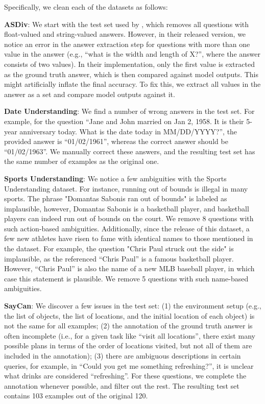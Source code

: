 \documentclass[11pt]{article}
\begin{document}
Specifically, we clean each of the datasets as follows: 

\textbf{ASDiv}: We start with the test set used by \citet{wei_chain_2022}, which removes all questions with float-valued and string-valued answers. However, in their released version, we notice an error in the answer extraction step for questions with more than one value in the answer (e.g., ``what is the width and length of X?'', where the answer consists of two values). In their implementation, only the first value is extracted as the ground truth answer, which is then compared against model outputs. This might artificially inflate the final accuracy. To fix this, we extract all values in the answer as a set and compare model outputs against it.

\textbf{Date Understanding}: We find a number of wrong answers in the test set. For example, for the question ``Jane and John married on Jan 2, 1958. It is their 5-year anniversary today. What is the date today in MM/DD/YYYY?'', the provided answer is ``01/02/1961'', whereas the correct answer should be ``01/02/1963''. We manually correct these answers, and the resulting test set has the same number of examples as the original one.

\textbf{Sports Understanding}: We notice a few ambiguities with the Sports Understanding dataset. For instance, running out of bounds is illegal in many sports. The phrase "Domantas Sabonis ran out of bounds" is labeled as implausible, however, Domantas Sabonis is a basketball player, and basketball players can indeed run out of bounds on the court. We remove 8 questions with such action-based ambiguities. Additionally, since the release of this dataset, a few new athletes have risen to fame with identical names to those mentioned in the dataset. For example, the question "Chris Paul struck out the side" is implausible, as the referenced ``Chris Paul'' is a famous basketball player. However, ``Chris Paul'' is also the name of a new MLB baseball player, in which case this statement is plausible. We remove 5 questions with such name-based ambiguities. 

\textbf{SayCan}: We discover a few issues in the test set: (1) the environment setup (e.g., the list of objects, the list of locations, and the initial location of each object) is not the same for all examples; (2) the annotation of the ground truth answer is often incomplete (i.e., for a given task like ``visit all locations'', there exist many possible plans in terms of the order of locations visited, but not all of them are included in the annotation); (3) there are ambiguous descriptions in certain queries, for example, in ``Could you get me something refreshing?'', it is unclear what drinks are considered ``refreshing''. For these questions, we complete the annotation whenever possible, and filter out the rest. The resulting test set contains 103 examples out of the original 120.
\end{document}
